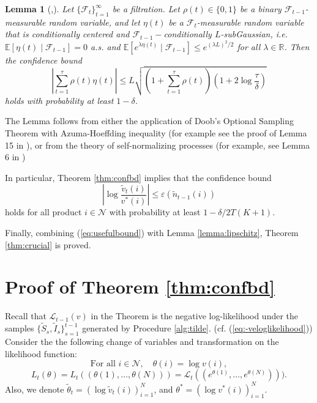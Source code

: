 \documentclass{article}
\newtheorem{lemma}[theorem]{Lemma}
\theoremstyle{definition}
\newcommand{\EEE}{\mathbb{E}}
\newcommand{\FFF}{\mathcal{F}}
\newcommand{\NNN}{\mathcal{N}}
\newcommand{\RRR}{\mathbb{R}}
\begin{document}
\begin{lemma}[\cite{AbbasiPS11},\cite{BubeckMSS11}]\label{lemma:selfnorm}
Let $\{\FFF_t\}^\infty_{t = 1}$ be a filtration. Let $\rho(t)\in\{0, 1\}$ be a binary $\FFF_{t-1}$-measurable random variable, and let $\eta(t)$ be a $\FFF_{t}$-measurable random variable that is conditionally centered and $\FFF_{t-1}-$conditionally $L$-subGaussian, i.e. $\EEE[\eta(t)\mid \FFF_{t-1}] = 0$ a.s. and  $\EEE[e^{\lambda \eta(t)}\mid \FFF_{t-1}] \leq e^{(\lambda L)^2/2}$ for all $\lambda\in \RRR$. Then the confidence bound 
\begin{equation}
\left|\sum^\tau_{t = 1}\rho(t) \eta(t)\right|\leq L\sqrt{\left(1 + \sum^\tau_{t=1}\rho(t)\right)\left(1 + 2\log{\frac{\tau}{\delta}}\right)}
\end{equation}
holds with probability at least $1-\delta$.
\end{lemma}

The Lemma follows from either the application of Doob's Optional Sampling Theorem with Azuma-Hoeffding inequality (for example see the proof of Lemma 15 in \cite{BubeckMSS11}), or from the theory of self-normalizing processes (for example, see Lemma 6 in \cite{AbbasiPS11})

In particular, Theorem \ref{thm:confbd} implies that the confidence bound
\begin{equation}\label{eq:usefulbound}
\left|\log\frac{\tilde{v}_{t}(i)}{v^*(i)}\right| \leq  \varepsilon(\tilde{n}_{t-1}(i))
\end{equation}
holds for all product $i\in \NNN$ with probability at least $1-\delta/2T(K+1)$. 

Finally, combining (\ref{eq:usefulbound}) with Lemma \ref{lemma:lipschitz}, Theorem \ref{thm:crucial} is proved.

\section{Proof of Theorem \ref{thm:confbd}}\label{app:pfthmconfbd}
Recall that $\mathcal{L}_{t-1}(v)$ in the Theorem is the negative log-likelihood under the samples $\{\tilde{S}_s, \tilde{I}_s\}^{t-1}_{s=1}$ generated by Procedure \ref{alg:tilde}. (cf. (\ref{eq:-veloglikelihood})) Consider the the following change of variables and transformation on the likelihood function:
$$
\text{For all } i\in \NNN, \quad \theta(i) = \log v(i),
$$
\begin{equation*}
L_t(\theta) = L_t((\theta(1), \ldots, \theta(N))) = \mathcal{L}_t((e^{\theta(1)}, \ldots, e^{\theta(N)}))).
\end{equation*}
Also, we denote $\tilde{\theta}_t = (\log \tilde{v}_t(i))^{N}_{i=1}$, and $\theta^* = (\log v^*(i))^N_{i = 1}$.
\end{document}

